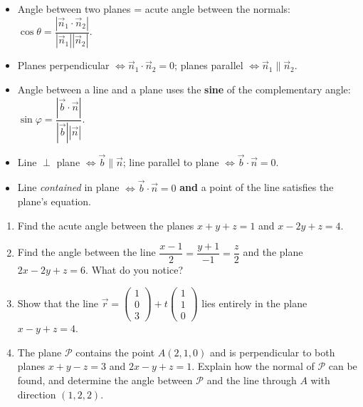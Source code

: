 \documentclass[11pt]{article}
\begin{document}
\begin{aretenir}
\begin{itemize}
\item Angle between two planes = acute angle between the normals: $\cos\theta=\dfrac{|\vec{n}_1\cdot\vec{n}_2|}{|\vec{n}_1||\vec{n}_2|}$.
\item Planes perpendicular $\iff \vec{n}_1\cdot\vec{n}_2=0$; planes parallel $\iff \vec{n}_1\parallel\vec{n}_2$.
\item Angle between a line and a plane uses the \textbf{sine} of the complementary angle: $\sin\varphi=\dfrac{|\vec{b}\cdot\vec{n}|}{|\vec{b}||\vec{n}|}$.
\item Line $\perp$ plane $\iff \vec{b}\parallel\vec{n}$; line parallel to plane $\iff \vec{b}\cdot\vec{n}=0$.
\item Line \emph{contained} in plane $\iff \vec{b}\cdot\vec{n}=0$ \textbf{and} a point of the line satisfies the plane's equation.
\end{itemize}
\end{aretenir}

\begin{exercice}[Practice]
\begin{enumerate}
\item Find the acute angle between the planes $x+y+z=1$ and $x-2y+z=4$.
\item Find the angle between the line $\dfrac{x-1}{2}=\dfrac{y+1}{-1}=\dfrac{z}{2}$ and the plane $2x-2y+z=6$. What do you notice?
\item Show that the line $\vec{r}=\begin{pmatrix}1\\0\\3\end{pmatrix}+t\begin{pmatrix}1\\1\\0\end{pmatrix}$ lies entirely in the plane $x-y+z=4$.
\item The plane $\mathcal{P}$ contains the point $A(2,1,0)$ and is perpendicular to both planes $x+y-z=3$ and $2x-y+z=1$. Explain how the normal of $\mathcal{P}$ can be found, and determine the angle between $\mathcal{P}$ and the line through $A$ with direction $(1,2,2)$.
\end{enumerate}
\end{exercice}
\end{document}
